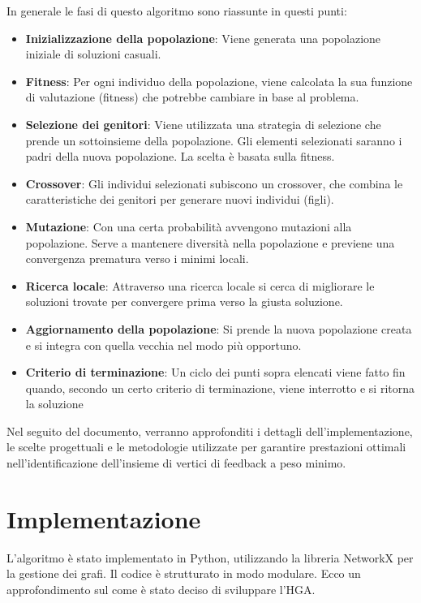 \documentclass[a4paper,12pt]{article}
\begin{document}
In generale le fasi di questo algoritmo sono riassunte in questi punti:

\begin{itemize}
    \item \textbf{Inizializzazione della popolazione}: Viene generata una popolazione iniziale di soluzioni casuali.
    \item \textbf{Fitness}: Per ogni individuo della popolazione, viene calcolata la sua funzione di valutazione (fitness) che potrebbe cambiare in base al problema.
    \item \textbf{Selezione dei genitori}: Viene utilizzata una strategia di selezione che prende un sottoinsieme della popolazione. Gli elementi selezionati saranno i padri della nuova popolazione. La scelta è basata sulla fitness.
    \item \textbf{Crossover}: Gli individui selezionati subiscono un crossover, che combina le caratteristiche dei genitori per generare nuovi individui (figli).
    \item \textbf{Mutazione}: Con una certa probabilità avvengono mutazioni alla popolazione. Serve a mantenere diversità nella popolazione e previene una convergenza prematura verso i minimi locali.
    \item \textbf{Ricerca locale}: Attraverso una ricerca locale si cerca di migliorare le soluzioni trovate per convergere prima verso la giusta soluzione.
    \item \textbf{Aggiornamento della popolazione}: Si prende la nuova popolazione creata e si integra con quella vecchia nel modo più opportuno.
    \item \textbf{Criterio di terminazione}: Un ciclo dei punti sopra elencati viene fatto fin quando, secondo un certo criterio di terminazione, viene interrotto e si ritorna la soluzione
\end{itemize}

Nel seguito del documento, verranno approfonditi i dettagli dell'implementazione, le scelte progettuali e le metodologie utilizzate per garantire prestazioni ottimali nell'identificazione dell'insieme di vertici di feedback a peso minimo.

\section{Implementazione}
L'algoritmo è stato implementato in Python, utilizzando la libreria NetworkX per la gestione dei grafi. Il codice è strutturato in modo modulare.
Ecco un approfondimento sul come è stato deciso di sviluppare l'HGA.
\end{document}
